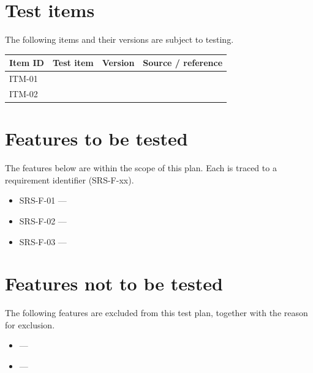 \documentclass[12pt,a4paper]{extarticle}
\begin{document}
\section{Test items}
The following items and their versions are subject to testing.

\begin{longtable}{L{2.5cm} L{6.5cm} L{2.2cm} L{3.0cm}}
\toprule
\textbf{Item ID} & \textbf{Test item} & \textbf{Version} & \textbf{Source / reference} \\
\midrule
\endhead
ITM-01 &  &  &  \\
ITM-02 &  &  &  \\
\bottomrule
\end{longtable}

\section{Features to be tested}
The features below are within the scope of this plan. Each is traced to a requirement identifier (SRS-F-xx).
\begin{itemize}
\item SRS-F-01 --- 
\item SRS-F-02 --- 
\item SRS-F-03 --- 
\end{itemize}

\section{Features not to be tested}
The following features are excluded from this test plan, together with the reason for exclusion.
\begin{itemize}
\item {} --- 
\item {} --- 
\end{itemize}

\end{document}
